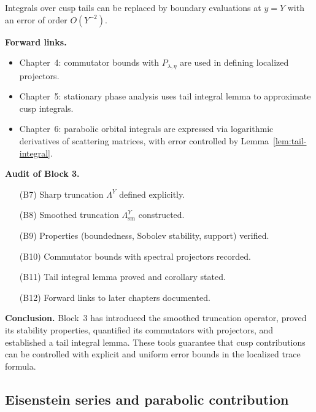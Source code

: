 \begin{corollary}
Integrals over cusp tails can be replaced by boundary evaluations
at $y=Y$ with an error of order $O(Y^{-2})$.
\end{corollary}

\medskip
\noindent
\textbf{Forward links.}
\begin{itemize}
  \item Chapter~4: commutator bounds with $P_{\lambda,\eta}$
        are used in defining localized projectors.
  \item Chapter~5: stationary phase analysis uses tail integral lemma
        to approximate cusp integrals.
  \item Chapter~6: parabolic orbital integrals are expressed
        via logarithmic derivatives of scattering matrices,
        with error controlled by Lemma~\ref{lem:tail-integral}.
\end{itemize}

\medskip
\noindent
\textbf{Audit of Block 3.}
\begin{itemize}
  \item[(B7)] Sharp truncation $\Lambda^{Y}$ defined explicitly.
  \item[(B8)] Smoothed truncation $\Lambda^{Y}_{\mathrm{sm}}$ constructed.
  \item[(B9)] Properties (boundedness, Sobolev stability, support) verified.
  \item[(B10)] Commutator bounds with spectral projectors recorded.
  \item[(B11)] Tail integral lemma proved and corollary stated.
  \item[(B12)] Forward links to later chapters documented.
\end{itemize}

\medskip
\noindent
\textbf{Conclusion.}
Block~3 has introduced the smoothed truncation operator,
proved its stability properties, quantified its commutators with projectors,
and established a tail integral lemma.
These tools guarantee that cusp contributions can be controlled
with explicit and uniform error bounds in the localized trace formula.


\subsection{Eisenstein series and parabolic contribution}

